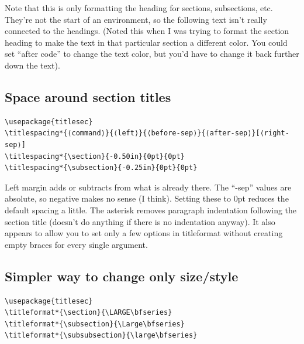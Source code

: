 \documentclass{article}
\begin{document}
Note that this is only formatting the heading for sections, subsections, etc.
They're not the start of an environment, so the following text isn't really
connected to the headings. (Noted this when I was trying to format the section
heading to make the text in that particular section a different color. You could
set ``after code'' to change the text color, but you'd have to change it back
further down the text).

\subsection{Space around section titles}
\begin{minipage}[t]{\textwidth}
\begin{lstlisting}
\usepackage{titlesec}
\titlespacing*{⟨command⟩}{⟨left⟩}{⟨before-sep⟩}{⟨after-sep⟩}[⟨right-sep⟩]
\titlespacing*{\section}{-0.50in}{0pt}{0pt}
\titlespacing*{\subsection}{-0.25in}{0pt}{0pt}
\end{lstlisting}
\end{minipage}
\begin{minipage}[t]{\textwidth}
    Left margin adds or subtracts from what is already there. The ``-sep'' values
    are absolute, so negative makes no sense (I think). Setting these to 0pt
    reduces the default spacing a little. The asterisk removes paragraph
    indentation following the section title (doesn't do anything if there
    is no indentation anyway). It also appears to allow you to set only a few options
    in titleformat without creating empty braces for every single argument.
\end{minipage}

\subsection{Simpler way to change only size/style}
\begin{lstlisting}
\usepackage{titlesec}
\titleformat*{\section}{\LARGE\bfseries}
\titleformat*{\subsection}{\Large\bfseries}
\titleformat*{\subsubsection}{\large\bfseries}
\end{lstlisting}
\end{document}
